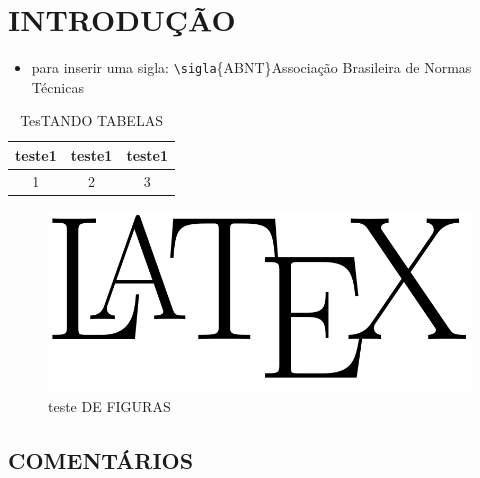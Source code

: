 \documentclass[
        12pt,                           %
        openright,                      %
        twoside,                        %
        a4paper,                        %
        chapter=TITLE,          %
        section=TITLE,          %
        subsection=Title,      %
        english,                        %
        portugues,                         %
        sumario=tradicional             %
        ]{abntex2}
\begin{document}
\renewcommand{\bibname}{\uppercase{REFER\^ENCIAS}}



\textual
\pagestyle{textualUFPR}

\chapter[INTRODUÇÃO]{INTRODUÇÃO}


\begin{itemize}
 \item para inserir uma sigla: \verb|\sigla|\{ABNT\}{Associa\c{c}\~ao Brasileira de Normas T\'ecnicas}
\end{itemize}


\begin{table}[!ht]
 \centering
 \par\caption{TesTANDO TABELAS}
 \begin{tabular}{c|c|c}
 teste1&teste1&teste1\\\hline\hline
  1&2&3\\\hline
 \end{tabular}
 \label{tab:tab01}
\end{table}

\begin{figure}[!ht]
 \centering
 \includegraphics[width=.50\textwidth]{figure}
 
 \caption{teste DE FIGURAS}
 \label{fig:01}
\end{figure}


\section{COMENTÁRIOS}
\end{document}
